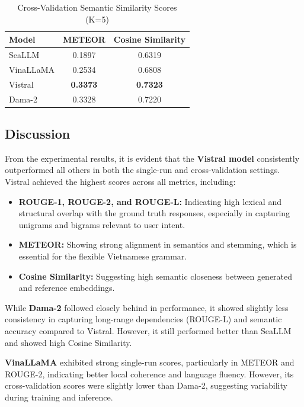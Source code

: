 \documentclass[conference]{IEEEtran}
\begin{document}
\begin{table}[H]
\centering
\caption{Cross-Validation Semantic Similarity Scores (K=5)}
\label{tab:cv-semantic}
\begin{tabular}{|l|c|c|}
\hline
\textbf{Model} & \textbf{METEOR} & \textbf{Cosine Similarity} \\
\hline
SeaLLM     & 0.1897 & 0.6319 \\
VinaLLaMA  & 0.2534 & 0.6808 \\
Vistral    & \textbf{0.3373} & \textbf{0.7323} \\
Dama-2     & 0.3328 & 0.7220 \\
\hline
\end{tabular}
\end{table}


\subsection{Discussion}

From the experimental results, it is evident that the \textbf{Vistral model} consistently outperformed all others in both the single-run and cross-validation settings. Vistral achieved the highest scores across all metrics, including:

\begin{itemize}
  \item \textbf{ROUGE-1, ROUGE-2, and ROUGE-L:} Indicating high lexical and structural overlap with the ground truth responses, especially in capturing unigrams and bigrams relevant to user intent.
  \item \textbf{METEOR:} Showing strong alignment in semantics and stemming, which is essential for the flexible Vietnamese grammar.
  \item \textbf{Cosine Similarity:} Suggesting high semantic closeness between generated and reference embeddings.
\end{itemize}

While \textbf{Dama-2} followed closely behind in performance, it showed slightly less consistency in capturing long-range dependencies (ROUGE-L) and semantic accuracy compared to Vistral. However, it still performed better than SeaLLM and showed high Cosine Similarity.

\textbf{VinaLLaMA} exhibited strong single-run scores, particularly in METEOR and ROUGE-2, indicating better local coherence and language fluency. However, its cross-validation scores were slightly lower than Dama-2, suggesting variability during training and inference.
\end{document}
